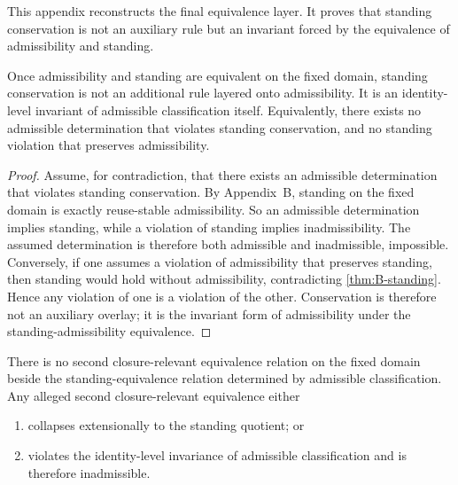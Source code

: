 \label{app:equivalence}

This appendix reconstructs the final equivalence layer. It proves that standing conservation is not an auxiliary rule but an invariant forced by the equivalence of admissibility and standing.

\begin{theorem}
\label{thm:E-conservation}
Once admissibility and standing are equivalent on the fixed domain, standing conservation is not an additional rule layered onto admissibility. It is an identity-level invariant of admissible classification itself. Equivalently, there exists no admissible determination that violates standing conservation, and no standing violation that preserves admissibility.
\end{theorem}

\begin{proof}
Assume, for contradiction, that there exists an admissible determination that violates standing conservation. By Appendix~B, standing on the fixed domain is exactly reuse-stable admissibility. So an admissible determination implies standing, while a violation of standing implies inadmissibility. The assumed determination is therefore both admissible and inadmissible, impossible. Conversely, if one assumes a violation of admissibility that preserves standing, then standing would hold without admissibility, contradicting \cref{thm:B-standing}. Hence any violation of one is a violation of the other. Conservation is therefore not an auxiliary overlay; it is the invariant form of admissibility under the standing-admissibility equivalence.
\end{proof}

\begin{theorem}
\label{thm:E-no-second-equivalence}
There is no second closure-relevant equivalence relation on the fixed domain beside the standing-equivalence relation determined by admissible classification. Any alleged second closure-relevant equivalence either
\begin{enumerate}[label=(\roman*), leftmargin=2.5em]
    \item collapses extensionally to the standing quotient; or
    \item violates the identity-level invariance of admissible classification and is therefore inadmissible.
\end{enumerate}
\end{theorem}

